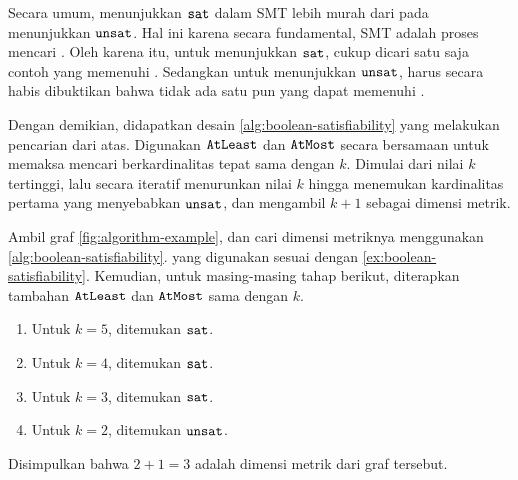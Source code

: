 Secara umum, menunjukkan \(\mathtt{sat}\) dalam SMT lebih murah dari pada menunjukkan \(\mathtt{unsat}\). Hal ini karena secara fundamental, SMT adalah proses mencari . Oleh karena itu, untuk menunjukkan \(\mathtt{sat}\), cukup dicari satu saja contoh yang memenuhi . Sedangkan untuk menunjukkan \(\mathtt{unsat}\), harus secara habis dibuktikan bahwa tidak ada satu pun  yang dapat memenuhi .

Dengan demikian, didapatkan desain \autoref{alg:boolean-satisfiability} yang melakukan pencarian dari atas. Digunakan \(\mathtt{AtLeast}\) dan \(\mathtt{AtMost}\) secara bersamaan untuk memaksa mencari  berkardinalitas tepat sama dengan \(k\). Dimulai dari nilai \(k\) tertinggi, lalu secara iteratif menurunkan nilai \(k\) hingga menemukan kardinalitas pertama yang menyebabkan \(\mathtt{unsat}\), dan mengambil \(k + 1\) sebagai dimensi metrik.

\begin{example}
	Ambil graf \autoref{fig:algorithm-example}, dan cari dimensi metriknya menggunakan \autoref{alg:boolean-satisfiability}.  yang digunakan sesuai dengan \autoref{ex:boolean-satisfiability}. Kemudian, untuk masing-masing tahap berikut, diterapkan  tambahan \(\mathtt{AtLeast}\) dan \(\mathtt{AtMost}\) sama dengan \(k\).
	\begin{enumerate}
		\item Untuk \(k = 5\), ditemukan \(\mathtt{sat}\).
		\item Untuk \(k = 4\), ditemukan \(\mathtt{sat}\).
		\item Untuk \(k = 3\), ditemukan \(\mathtt{sat}\).
		\item Untuk \(k = 2\), ditemukan \(\mathtt{unsat}\).
	\end{enumerate}
	Disimpulkan bahwa \(2 + 1 = 3\) adalah dimensi metrik dari graf tersebut.
\end{example}

\vspace{-0.5em}

